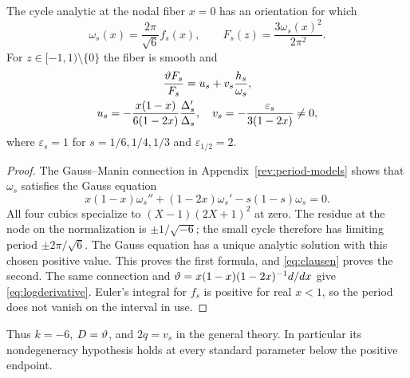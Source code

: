 \begin{lemma}\label{lem:period}
The cycle analytic at the nodal fiber $x=0$ has an orientation for
which
\begin{equation}\label{eq:normalization}
 \omega_s(x)=\frac{2\pi}{\sqrt6}f_s(x),\qquad
 F_s(z)=\frac{3\omega_s(x)^2}{2\pi^2}.
\end{equation}
For $z\in[-1,1)\setminus\{0\}$ the fiber is smooth and
\begin{equation}\label{eq:logderivative}
 \begin{gathered}
 \frac{\vartheta F_s}{F_s}
    =u_s+v_s\frac{h_s}{\omega_s},\\
 u_s=-\frac{x(1-x)}{6(1-2x)}\frac{\Delta_s'}{\Delta_s},\quad
 v_s=-\frac{\varepsilon_s}{3(1-2x)}\ne0,
 \end{gathered}
\end{equation}
where $\varepsilon_s=1$ for $s=1/6,1/4,1/3$ and
$\varepsilon_{1/2}=2$.
\end{lemma}
\begin{proof}
The Gauss--Manin connection in Appendix~\ref{rev:period-models}
shows that $\omega_s$ satisfies the Gauss equation
\[
 x(1-x)\omega_s''+(1-2x)\omega_s'-s(1-s)\omega_s=0.
\]
All four cubics specialize to $(X-1)(2X+1)^2$ at zero. The residue
at the node on the normalization is $\pm1/\sqrt{-6}$; the small
cycle therefore has limiting period $\pm2\pi/\sqrt6$.
The Gauss equation has a unique analytic solution with this chosen
positive value. This proves the first formula, and
\eqref{eq:clausen} proves the second. The same connection and
$\vartheta=x(1-x)(1-2x)^{-1}d/dx$ give
\eqref{eq:logderivative}. Euler's integral for $f_s$ is positive
for real $x<1$, so the period does not vanish on the interval in use.
\end{proof}
Thus $k=-6$, $D=\vartheta$, and $2q=v_s$ in the general theory.
In particular its nondegeneracy hypothesis holds at every standard
parameter below the positive endpoint.

